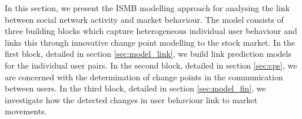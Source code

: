 In this section, we present the ISMB modelling approach for analysing the link between social network activity and market behaviour. The model consists of three building blocks which capture heterogeneous individual user behaviour and links this through innovative change point modelling to the stock market. In the first block, detailed in section \ref{sec:model_link}, we build link prediction models for the individual user pairs. In the second block, detailed in section \ref{sec:cps}, we are concerned with the determination of change points in the communication between users. In the third block, detailed in section \ref{sec:model_fin}, we investigate how the detected changes in user behaviour link to market movements. %







